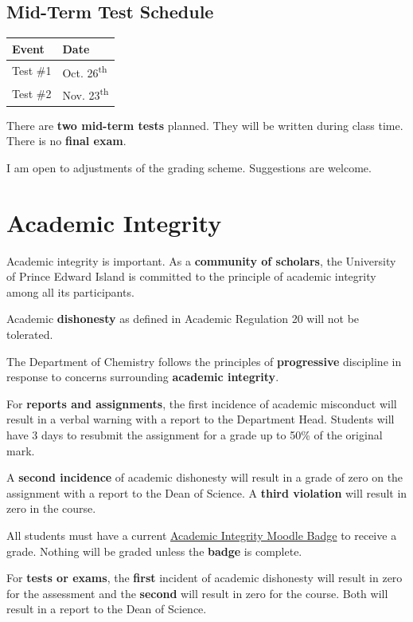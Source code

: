 \subsection{Mid-Term Test Schedule}

\begin{center}
\begin{tabular}{ll}
\hline
Event & Date \\
\hline
Test \#1 & Oct. 26\textsuperscript{th} \\
Test \#2 & Nov. 23\textsuperscript{th} \\
\hline
\end{tabular}
\end{center}

There are \textbf{two mid-term tests} planned. They will be written during class time. There is no \textbf{final exam}.

I am open to adjustments of the grading scheme. Suggestions are welcome.

\section{Academic Integrity}

Academic integrity is important. As a \textbf{community of scholars}, the University of Prince Edward Island is committed to the principle of academic integrity among all its participants.

Academic \textbf{dishonesty} as defined in Academic Regulation 20 will not be tolerated.

The Department of Chemistry follows the principles of \textbf{progressive} discipline in response to concerns surrounding \textbf{academic integrity}.

For \textbf{reports and assignments}, the first incidence of academic misconduct will result in a verbal warning with a report to the Department Head. Students will have 3 days to resubmit the assignment for a grade up to 50\% of the original mark.

A \textbf{second incidence} of academic dishonesty will result in a grade of zero on the assignment with a report to the Dean of Science. A \textbf{third violation} will result in zero in the course.

All students must have a current \href{https://library.upei.ca/ai/home}{Academic Integrity Moodle Badge} to receive a grade. Nothing will be graded unless the \textbf{badge} is complete.

For \textbf{tests or exams}, the \textbf{first} incident of academic dishonesty will result in zero for the assessment and the \textbf{second} will result in zero for the course. Both will result in a report to the Dean of Science.

